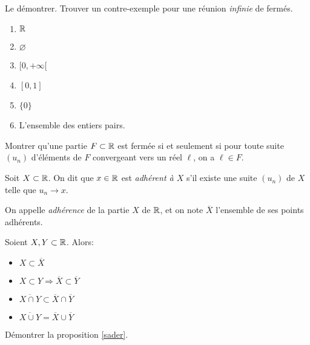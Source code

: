 \documentclass[../main.tex]{subfiles}
\begin{document}
\begin{exo}[M]
	Le démontrer. Trouver un contre-exemple pour une réunion \textit{infinie} de fermés.
\end{exo}

\begin{exe}\leavevmode
	\begin{multicols}{2}
		\begin{enumerate}
			\item $\mathbb R$
			\item $\varnothing$
			\item $[0,+\infty[$
			\item $[0,1]$
			\item $\{0\} $
			\item L'ensemble des entiers pairs.
		\end{enumerate}
	\end{multicols}
\end{exe}

\begin{exo}[M]
	Montrer qu'une partie $F\subset\mathbb R$ est fermée si et seulement si pour toute suite $(u_n)$ d'éléments de $F$ convergeant vers un réel $\ell$, on a $\ell\in F$.
\end{exo}

\begin{mydef}
	Soit $X\subset\mathbb R$. On dit que $x\in\mathbb R$ est \textit{adhérent à $X$} s'il existe une suite $(u_n)$ de $X$ telle que $u_n\longrightarrow x$.
\end{mydef}

\begin{mydef}[Adhérence]
	On appelle \textit{adhérence} de la partie $X$ de $\mathbb R$, et on note $\overline{X}$ l'ensemble de ses points adhérents.
\end{mydef}

\begin{prop}\label{sader}
	Soient $X,Y\subset\mathbb R$. Alors:\begin{itemize}
		\item $X\subset\overline{X}$
		\item $X\subset Y\Longrightarrow \overline{X}\subset\overline{Y}$
		\item $\overline{X\cap Y}\subset \overline{X}\cap\overline{Y}$
		\item $\overline{X\cup Y} = \overline{X}\cup\overline{Y}$
	\end{itemize}
\end{prop}

\begin{exo}[M]
	Démontrer la proposition \ref{sader}.
\end{exo}
\end{document}
